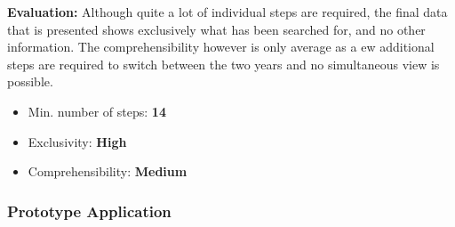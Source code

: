 \textbf{Evaluation:}  Although quite a lot of individual steps are required, the final data that is presented shows exclusively what has been searched for, and no other information. The comprehensibility however is only average as a ew additional steps are required to switch between the two years and no simultaneous view is possible. 
\begin{itemize}[noitemsep,nolistsep]
	\item Min. number of steps: \textbf{14}
	\item Exclusivity: \textbf{High}
	\item Comprehensibility: \textbf{Medium}
\end{itemize}



\subsubsection{Prototype Application}

